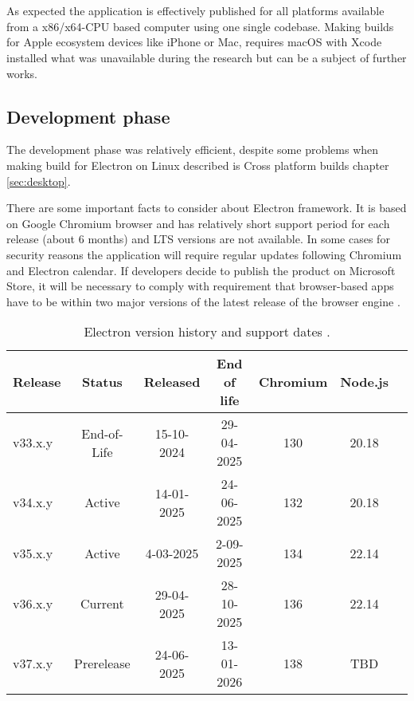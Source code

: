 \chapter{}%
\label{ch:results}

As expected the application is effectively published for all platforms available from a x86/x64-CPU based computer using one single codebase. Making builds for Apple ecosystem devices like iPhone or Mac, requires macOS with Xcode installed what was unavailable during the research but can be a subject of further works.


\section{{Development phase}}%
\label{sec:development_evaluation}

The development phase was relatively efficient, despite some problems when making build for Electron on Linux described is Cross platform builds chapter \ref{sec:desktop}.

There are some important facts to consider about Electron framework. It is based on Google Chromium browser and has relatively short support period for each release (about 6 months) and LTS versions are not available. In some cases for security reasons the application will require regular updates following Chromium and Electron calendar. If developers decide to publish the product on Microsoft Store, it will be necessary to comply with requirement that  browser-based apps have to be within two major versions of the latest release of the browser engine \autocite{MSstoreElectron}.

\begin{table}[H]
    \centering
    \begin{tabular}{lcccccc}
        \toprule
        Release & Status & Released & End of life & Chromium & Node.js\\
        \midrule
        v33.x.y  &  End-of-Life  &  15-10-2024  &  29-04-2025  &  130  &  20.18   \\
        v34.x.y  &  Active  &  14-01-2025  &  24-06-2025  &  132  &  20.18   \\
        v35.x.y  &  Active  &  4-03-2025  &  2-09-2025  &  134  &  22.14   \\
        v36.x.y  &  Current  &  29-04-2025  &  28-10-2025  &  136  &  22.14   \\
        v37.x.y  &  Prerelease  &  24-06-2025  &  13-01-2026  &  138  &  TBD   \\ 
        \bottomrule
\end{tabular}
\caption[Electron version history]{\label{tab:electronhistory}Electron version history and support dates \autocite{ElectronReleases}.
}
\end{table}


